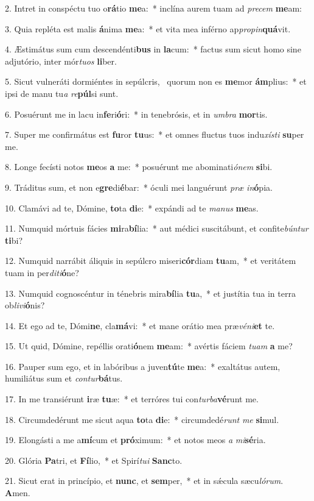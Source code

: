 2. Intret in conspéctu tuo o\textbf{rá}tio \textbf{me}a:~*  inclína aurem tuam ad \textit{pre}\textit{cem} \textbf{me}am:\

3. Quia repléta est malis \textbf{á}nima \textbf{me}a:~*  et vita mea inférno ap\textit{pro}\textit{pin}\textbf{quá}vit.\

4. Æstimátus sum cum descendénti\textbf{bus} in \textbf{la}cum:~*  factus sum sicut homo sine adjutório, inter mór\textit{tu}\textit{os} \textbf{li}ber.\

5. Sicut vulneráti dormiéntes in sepúlcris, \dag\  quorum non es \textbf{me}mor \textbf{ám}plius:~*  et ipsi de manu tu\textit{a} \textit{re}\textbf{púl}si sunt.\

6. Posuérunt me in lacu in\textbf{fe}ri\textbf{ó}ri:~*  in tenebrósis, et in \textit{um}\textit{bra} \textbf{mor}tis.\

7. Super me confirmátus est \textbf{fu}ror \textbf{tu}us:~*  et omnes fluctus tuos indu\textit{xís}\textit{ti} \textbf{su}per me.\

8. Longe fecísti notos \textbf{me}os \textbf{a} me:~*  posuérunt me abominati\textit{ó}\textit{nem} \textbf{si}bi.\

9. Tráditus sum, et non e\textbf{gre}di\textbf{é}bar:~*  óculi mei languérunt \textit{præ} \textit{in}\textbf{ó}pia.\

10. Clamávi ad te, Dómine, \textbf{to}ta \textbf{di}e:~*  expándi ad te \textit{ma}\textit{nus} \textbf{me}as.\

11. Numquid mórtuis fácies \textbf{mi}ra\textbf{bí}lia:~*  aut médici suscitábunt, et confite\textit{bún}\textit{tur} \textbf{ti}bi?\

12. Numquid narrábit áliquis in sepúlcro miseri\textbf{cór}diam \textbf{tu}am,~*  et veritátem tuam in per\textit{di}\textit{ti}\textbf{ó}ne?\

13. Numquid cognoscéntur in ténebris mira\textbf{bí}lia \textbf{tu}a,~*  et justítia tua in terra ob\textit{li}\textit{vi}\textbf{ó}nis?\

14. Et ego ad te, Dómi\textbf{ne}, cla\textbf{má}vi:~*  et mane orátio mea præ\textit{vé}\textit{ni}\textbf{et} te.\

15. Ut quid, Dómine, repéllis orati\textbf{ó}nem \textbf{me}am:~*  avértis fáciem \textit{tu}\textit{am} \textbf{a} me?\

16. Pauper sum ego, et in labóribus a juven\textbf{tú}te \textbf{me}a:~*  exaltátus autem, humiliátus sum et \textit{con}\textit{tur}\textbf{bá}tus.\

17. In me transiérunt \textbf{i}ræ \textbf{tu}æ:~*  et terróres tui con\textit{tur}\textit{ba}\textbf{vé}runt me.\

18. Circumdedérunt me sicut aqua \textbf{to}ta \textbf{di}e:~*  circumdedé\textit{runt} \textit{me} \textbf{si}mul.\

19. Elongásti a me a\textbf{mí}cum et \textbf{pró}ximum:~*  et notos meos \textit{a} \textit{mi}\textbf{sé}ria.\

20. Glória \textbf{Pa}tri, et \textbf{Fí}lio,~*  et Spirí\textit{tu}\textit{i} \textbf{Sanc}to.\

21. Sicut erat in princípio, et \textbf{nunc}, et \textbf{sem}per,~*  et in sǽcula sæcu\textit{ló}\textit{rum}. \textbf{A}men.\

